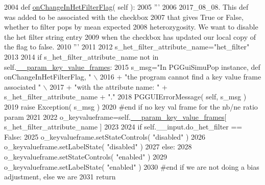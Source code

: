 \begin{DoxyCode}
2004     \textcolor{keyword}{def }\hyperlink{classnegui_1_1pgguisimupop__experimental_1_1PGGuiSimuPop_a1bd444cda1ad42319d3b893e36c82a48}{onChangeInHetFilterFlag}( self ):
2005         \textcolor{stringliteral}{'''}
2006 \textcolor{stringliteral}{        2017\_08\_08.  This def was added to be associated with the checkbox}
2007 \textcolor{stringliteral}{        that gives True or False, whether to filter pops by mean expected}
2008 \textcolor{stringliteral}{        heterozygosity.  We want to disable the het filter string entry }
2009 \textcolor{stringliteral}{        when the checkbox has updated our local copy of the flag to false.}
2010 \textcolor{stringliteral}{        '''}
2011 
2012         s\_het\_filter\_attribute\_name=\textcolor{stringliteral}{"het\_filter"}
2013 
2014         \textcolor{keywordflow}{if} s\_het\_filter\_attribute\_name \textcolor{keywordflow}{not} \textcolor{keywordflow}{in} self.\hyperlink{classnegui_1_1pgguisimupop__experimental_1_1PGGuiSimuPop_ad95dc47c19913b4eb1a4151af1e5879d}{\_\_param\_key\_value\_frames}:
2015             s\_msg=\textcolor{stringliteral}{"In PGGuiSimuPop instance, def onChangeInHetFilterFlag, "} \(\backslash\)
2016                         + \textcolor{stringliteral}{"the program cannot find a key value frame associated "} \(\backslash\)
2017                         + \textcolor{stringliteral}{"with the attribute name: "} + s\_het\_filter\_attribute\_name + \textcolor{stringliteral}{"."}
2018             PGGUIErrorMessage( self, s\_msg )
2019             \textcolor{keywordflow}{raise} Exception( s\_msg )
2020         \textcolor{comment}{#end if no key val frame for the nb/ne ratio param}
2021 
2022         o\_keyvalueframe=self.\hyperlink{classnegui_1_1pgguisimupop__experimental_1_1PGGuiSimuPop_ad95dc47c19913b4eb1a4151af1e5879d}{\_\_param\_key\_value\_frames}[ s\_het\_filter\_attribute\_name 
      ]
2023 
2024         \textcolor{keywordflow}{if} self.\_\_input.do\_het\_filter == \textcolor{keyword}{False}:
2025             o\_keyvalueframe.setStateControls( \textcolor{stringliteral}{"disabled"} )
2026             o\_keyvalueframe.setLabelState( \textcolor{stringliteral}{"disabled"} )
2027         \textcolor{keywordflow}{else}:
2028             o\_keyvalueframe.setStateControls( \textcolor{stringliteral}{"enabled"} )
2029             o\_keyvalueframe.setLabelState( \textcolor{stringliteral}{"enabled"} )
2030         \textcolor{comment}{#end if we are not doing a bias adjustment, else we are }
2031         \textcolor{keywordflow}{return}
\end{DoxyCode}

